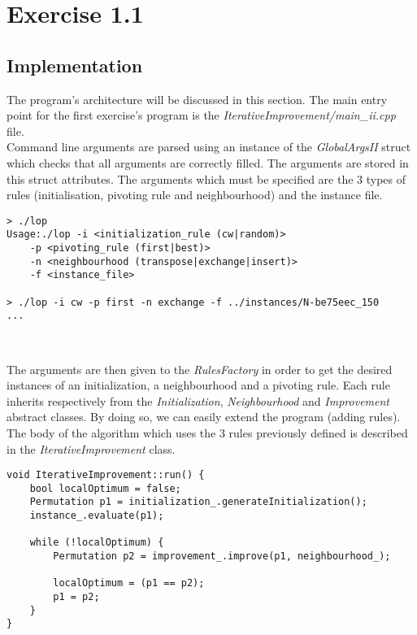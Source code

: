 \section{Exercise 1.1}

\subsection{Implementation}
The program's architecture will be discussed in this section. The main entry
point for the first exercise's program is the \emph{IterativeImprovement/main\_ii.cpp}
file.\\

Command line arguments are parsed using an instance of the \emph{GlobalArgsII}
struct which checks that all arguments are correctly filled. The arguments are
stored in this struct attributes. The arguments which must be specified are
the 3 types of rules (initialisation, pivoting rule and neighbourhood) and the
instance file.\\

\begin{lstlisting}
> ./lop
Usage:./lop -i <initialization_rule (cw|random)>
	-p <pivoting_rule (first|best)>
	-n <neighbourhood (transpose|exchange|insert)>
	-f <instance_file>

> ./lop -i cw -p first -n exchange -f ../instances/N-be75eec_150
...
\end{lstlisting}
\

The arguments are then given to the \emph{RulesFactory} in order to get the
desired instances of an initialization, a neighbourhood and a pivoting rule.
Each rule inherits respectively from the \emph{Initialization},
\emph{Neighbourhood} and \emph{Improvement} abstract classes. By doing so, we
can easily extend the program (adding rules).\\

The body of the algorithm which uses the 3 rules previously defined is described
in the \emph{IterativeImprovement} class.\\

\begin{lstlisting}
void IterativeImprovement::run() {
    bool localOptimum = false;
    Permutation p1 = initialization_.generateInitialization();
    instance_.evaluate(p1);
    
    while (!localOptimum) {
        Permutation p2 = improvement_.improve(p1, neighbourhood_);
        
        localOptimum = (p1 == p2);
        p1 = p2;
    }
}
\end{lstlisting}
\


